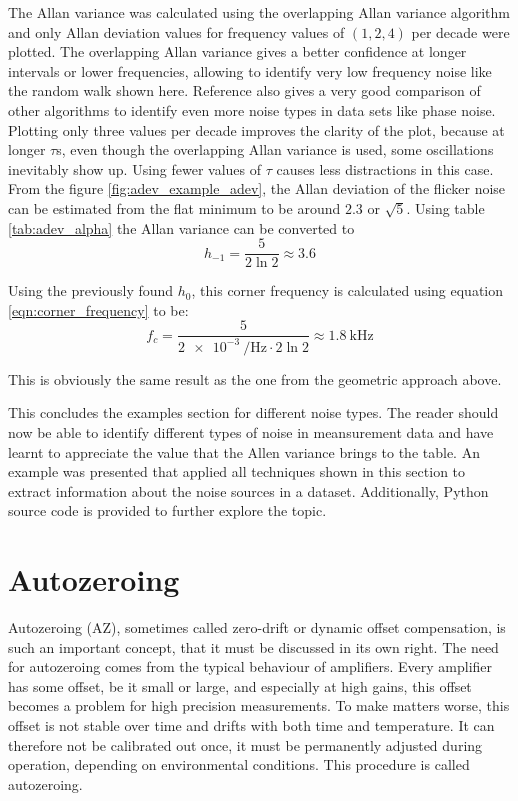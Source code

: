 The Allan variance was calculated using the overlapping Allan variance algorithm \cite{oadev_definition} and only Allan deviation values for frequency values of $(1, 2, 4)$ per decade were plotted. The overlapping Allan variance gives a better confidence at longer intervals or lower frequencies, allowing to identify very low frequency noise like the random walk shown here. Reference \cite{oadev_definition} also gives a very good comparison of other algorithms to identify even more noise types in data sets like phase noise. Plotting only three values per decade improves the clarity of the plot, because at longer $\tau$s, even though the overlapping Allan variance is used, some oscillations inevitably show up. Using fewer values of $\tau$ causes less distractions in this case.
From the figure \ref{fig:adev_example_adev}, the Allan deviation of the flicker noise can be estimated from the flat minimum to be around $2.3$ or $\sqrt{5}$. Using table \ref{tab:adev_alpha} the Allan variance can be converted to
\begin{equation*}
    h_{-1} = \frac{5}{2 \ln 2} \approx 3.6
\end{equation*}

Using the previously found $h_0$, this corner frequency is calculated using equation \ref{eqn:corner_frequency} to be:
\begin{equation*}
    f_c = \frac{5}{\qty{2e-3}{\per \Hz} \cdot 2 \ln 2} \approx \qty{1.8}{\kHz}
\end{equation*}

This is obviously the same result as the one from the geometric approach above.

This concludes the examples section for different noise types. The reader should now be able to identify different types of noise in meansurement data and have learnt to appreciate the value that the Allen variance brings to the table. An example was presented that applied all techniques shown in this section to extract information about the noise sources in a dataset. Additionally, Python source code is provided to further explore the topic.

\clearpage
\section{Autozeroing}%
\label{sec:autozero}
Autozeroing (AZ), sometimes called zero-drift or dynamic offset compensation, is such an important concept, that it must be discussed in its own right. The need for autozeroing comes from the typical behaviour of amplifiers. Every amplifier has some offset, be it small or large, and especially at high gains, this offset becomes a problem for high precision measurements. To make matters worse, this offset is not stable over time and drifts with both time and temperature. It can therefore not be calibrated out once, it must be permanently adjusted during operation, depending on environmental conditions. This procedure is called autozeroing.

